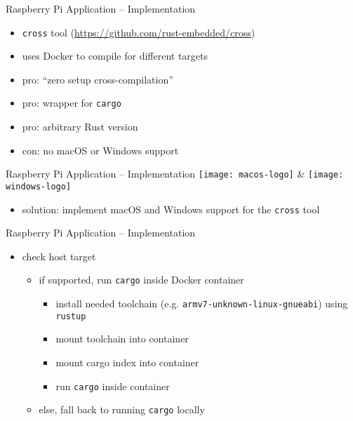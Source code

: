 \documentclass[aspectratio=1610]{beamer}
\newcommand\green[1]{{\color{green(ncs)}#1}}
\newcommand\red[1]{{\color{amaranth}#1}}
\begin{document}
  \begin{frame}{Raspberry Pi Application -- Implementation}
    \begin{itemize}
      \item \texttt{cross} tool (\url{https://github.com/rust-embedded/cross})
      \item uses Docker to compile for different targets
      \item \green{pro:} “zero setup cross-compilation”
      \item \green{pro:} wrapper for \texttt{cargo}
      \item \green{pro:} arbitrary Rust version
      \item \red{con:} no macOS or Windows support
    \end{itemize}
  \end{frame}

  \begin{frame}{Raspberry Pi Application -- Implementation}
    \texttt{[image: macos-logo]}
    \hspace*{1em}
    \&
    \hspace*{1em}
    \texttt{[image: windows-logo]}

    \vspace*{1.5em}

    \begin{itemize}
      \item \green{solution:} implement macOS and Windows support for the \texttt{cross} tool
    \end{itemize}
  \end{frame}

  \begin{frame}{Raspberry Pi Application -- Implementation}
    \begin{itemize}
      \item check host target
        \begin{itemize}
          \item if supported, run \texttt{cargo} inside Docker container
            \begin{itemize}
              \item install needed toolchain (e.g. \texttt{armv7-unknown-linux-gnueabi}) using \texttt{rustup}
              \item mount toolchain into container
              \item mount cargo index into container
              \item run \texttt{cargo} inside container
            \end{itemize}
          \item else, fall back to running \texttt{cargo} locally
        \end{itemize}
    \end{itemize}
  \end{frame}
\end{document}
